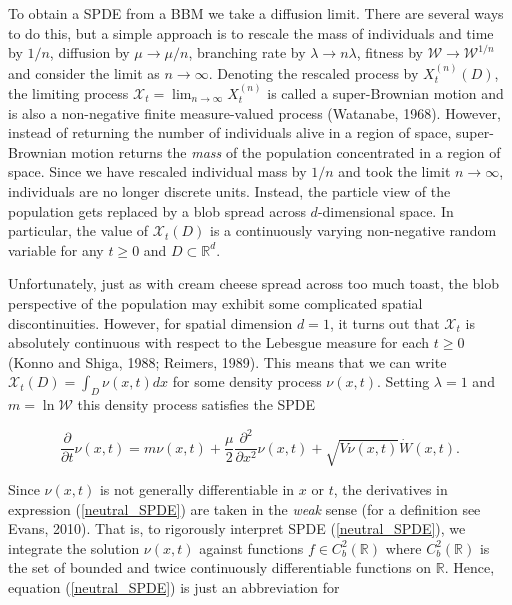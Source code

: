 \documentclass[]{elsarticle} %
\begin{document}
To obtain a SPDE from a BBM we take a diffusion limit. There are several
ways to do this, but a simple approach is to rescale the mass of
individuals and time by \(1/n\), diffusion by \(\mu\to\mu/n\), branching
rate by \(\lambda\to n\lambda\), fitness by
\(\mathscr{W}\to\mathscr{W}^{1/n}\) and consider the limit as
\(n\to\infty\). Denoting the rescaled process by \(X_t^{(n)}(D)\), the
limiting process \(\mathscr{X}_t=\lim_{n\to\infty}X_t^{(n)}\) is called
a super-Brownian motion and is also a non-negative finite measure-valued
process (Watanabe, 1968). However, instead of returning the number of
individuals alive in a region of space, super-Brownian motion returns
the \emph{mass} of the population concentrated in a region of space.
Since we have rescaled individual mass by \(1/n\) and took the limit
\(n\to\infty\), individuals are no longer discrete units. Instead, the
particle view of the population gets replaced by a blob spread across
\(d\)-dimensional space. In particular, the value of
\(\mathscr{X}_t(D)\) is a continuously varying non-negative random
variable for any \(t\geq0\) and \(D\subset\mathbb{R}^d\).

Unfortunately, just as with cream cheese spread across too much toast,
the blob perspective of the population may exhibit some complicated
spatial discontinuities. However, for spatial dimension \(d=1\), it
turns out that \(\mathscr{X}_t\) is absolutely continuous with respect
to the Lebesgue measure for each \(t\geq0\) (Konno and Shiga, 1988;
Reimers, 1989). This means that we can write
\(\mathscr{X}_t(D)=\int_D \nu(x,t)dx\) for some density process
\(\nu(x,t)\). Setting \(\lambda=1\) and \(m=\ln\mathscr{W}\) this
density process satisfies the SPDE

\begin{equation}\label{neutral_SPDE}
\frac{\partial}{\partial t}\nu(x,t)=m\nu(x,t)+\frac{\mu}{2}\frac{\partial^2}{\partial x^2}\nu(x,t)+\sqrt{V\nu(x,t)}\dot W(x,t).
\end{equation}

Since \(\nu(x,t)\) is not generally differentiable in \(x\) or \(t\),
the derivatives in expression (\ref{neutral_SPDE}) are taken in the
\emph{weak} sense (for a definition see Evans, 2010). That is, to
rigorously interpret SPDE (\ref{neutral_SPDE}), we integrate the
solution \(\nu(x,t)\) against functions \(f\in C_b^2(\mathbb{R})\) where
\(C_b^2(\mathbb{R})\) is the set of bounded and twice continuously
differentiable functions on \(\mathbb{R}\). Hence, equation
(\ref{neutral_SPDE}) is just an abbreviation for
\end{document}
